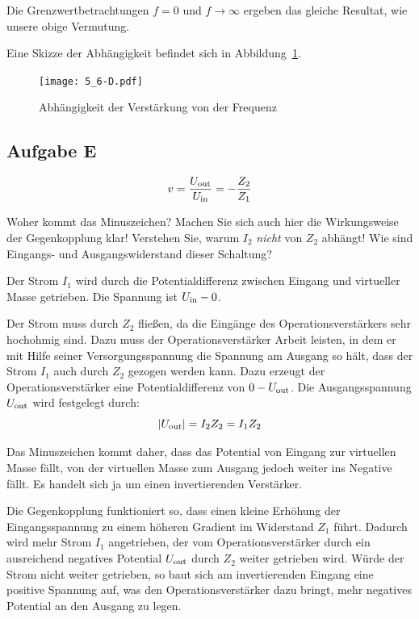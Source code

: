 Die Grenzwertbetrachtungen $f = 0$ und $f \to \infty$ ergeben das gleiche
Resultat, wie unsere obige Vermutung.

Eine Skizze der Abhängigkeit befindet sich in Abbildung~\ref{fig:5_6-D}.

\begin{figure}[htbp]
    \centering
    \texttt{[image: 5\_6-D.pdf]}
    \caption{%
        Abhängigkeit der Verstärkung von der Frequenz
    }
    \label{fig:5_6-D}
\end{figure}

\FloatBarrier
\subsection{Aufgabe E}

\begin{problem}
	\[
		v = \frac{U_\text{out}}{U_\text{in}} = - \frac{Z_2}{Z_1}
	\]

	Woher kommt das Minuszeichen? Machen Sie sich auch hier die Wirkungsweise
	der Gegenkopplung klar! Verstehen Sie, warum $I_2$ \emph{nicht} von $Z_2$
	abhängt! Wie sind Eingangs- und Ausgangswiderstand dieser Schaltung?
\end{problem}

Der Strom $I_1$ wird durch die Potentialdifferenz zwischen Eingang und
virtueller Masse getrieben. Die Spannung ist $U_\text{in} - 0$.

Der Strom muss durch $Z_2$ fließen, da die Eingänge des Operationsverstärkers
sehr hochohmig sind. Dazu muss der Operationsverstärker Arbeit leisten, in dem
er mit Hilfe seiner Versorgungsspannung die Spannung am Ausgang so hält, dass
der Strom $I_1$ auch durch $Z_2$ gezogen werden kann. Dazu erzeugt der
Operationsverstärker eine Potentialdifferenz von $0 - U_\text{out}$. Die
Ausgangsspannung $U_\text{out}$ wird festgelegt durch:
\[
	|U_\text{out}| = I_2 Z_2 = I_1 Z_2
\]

Das Minuszeichen kommt daher, dass das Potential von Eingang zur virtuellen
Masse fällt, von der virtuellen Masse zum Ausgang jedoch weiter ins Negative
fällt. Es handelt sich ja um einen invertierenden Verstärker.

Die Gegenkopplung funktioniert so, dass einen kleine Erhöhung der
Eingangsspannung zu einem höheren Gradient im Widerstand $Z_1$ führt. Dadurch
wird mehr Strom $I_1$ angetrieben, der vom Operationsverstärker durch ein
ausreichend negatives Potential $U_\text{out}$ durch $Z_2$ weiter getrieben wird.
Würde der Strom nicht weiter getrieben, so baut sich am invertierenden Eingang
eine positive Spannung auf, was den Operationsverstärker dazu bringt, mehr
negatives Potential an den Ausgang zu legen.

